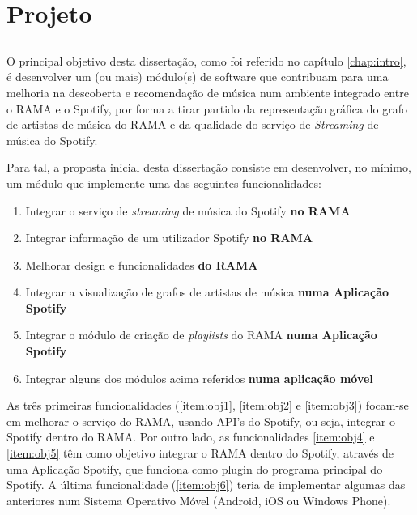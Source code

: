 
\chapter{Projeto}
\label{chap:chap3}

\section*{}

O principal objetivo desta dissertação, como foi referido no capítulo \ref{chap:intro}, é desenvolver um (ou mais) módulo(s) de software que contribuam para uma melhoria na descoberta e recomendação de música num ambiente integrado entre o RAMA e o Spotify, por forma a tirar partido da representação gráfica do grafo de artistas de música do RAMA e da qualidade do serviço de \emph{Streaming} de música do Spotify.

Para tal, a proposta inicial desta dissertação consiste em desenvolver, no mínimo, um módulo que implemente uma das seguintes funcionalidades:

\begin{enumerate}
  \item \label{item:obj1} Integrar o serviço de \emph{streaming} de música do Spotify \textbf{no RAMA}
  \item \label{item:obj2} Integrar informação de um utilizador Spotify \textbf{no RAMA}
  \item \label{item:obj3} Melhorar design e funcionalidades \textbf{do RAMA}
  \item \label{item:obj4} Integrar a visualização de grafos de artistas de música \textbf{numa Aplicação Spotify}
  \item \label{item:obj5} Integrar o módulo de criação de \emph{playlists} do RAMA \textbf{numa Aplicação Spotify}
  \item \label{item:obj6} Integrar alguns dos módulos acima referidos \textbf{numa aplicação móvel}
\end{enumerate}

As três primeiras funcionalidades (\ref{item:obj1}, \ref{item:obj2} e \ref{item:obj3}) focam-se em melhorar o serviço do RAMA, usando API's do Spotify, ou seja, integrar o Spotify dentro do RAMA.
Por outro lado, as funcionalidades \ref{item:obj4} e \ref{item:obj5} têm como objetivo integrar o RAMA dentro do Spotify, através de uma Aplicação Spotify, que funciona como plugin do programa principal do Spotify.
A última funcionalidade (\ref{item:obj6}) teria de implementar algumas das anteriores num Sistema Operativo Móvel (Android, iOS ou Windows Phone).

